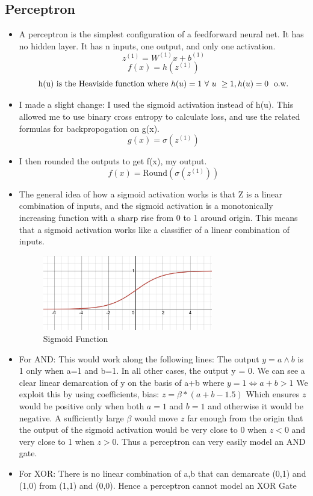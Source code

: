 \documentclass[12pt,a4paper]{article}
\begin{document}
\subsection{Perceptron} 
\begin{itemize}
\item A perceptron is the simplest configuration of a feedforward neural net. It has no hidden layer. It has n inputs, one output, and only one activation. \\
\[ z^{(1)} = W^{(1)}x + b^{(1)} \]
\[ f(x) = h( z^{(1)}) \]
\[\text{h(u) is the Heaviside function where} \\  \  h(u) = 1 \ \forall \ u \ \ge 1, h(u) = 0 \ \ \text{o.w.} \]
\item I made a slight change: I used the sigmoid activation instead of h(u). This allowed me to use binary cross entropy to calculate loss, and use the related formulas for backpropogation on g(x). 
\[ g(x) = \sigma( z^{(1)}) \]
\item I then rounded the outputs to get f(x), my output.
\[ f(x) = \text{Round}(\sigma( z^{(1)})) \]
\item The general idea of how a sigmoid activation works is that Z is a linear combination of inputs, and the sigmoid activation is a monotonically increasing function with a sharp rise from 0 to 1 around origin. This means that a sigmoid activation works like a classifier of a linear combination of inputs.
\begin{figure}[h!]
    \centering
    \includegraphics[width=0.7\textwidth]{sigmoid} 
    \caption{Sigmoid Function}
    \label{fig:example}
\end{figure}
\item For AND: This would work along the following lines:
\subitem The output  $y = a\land b$ is 1 only when a=1 and b=1. In all other cases, the output y = 0. We can see a clear linear demarcation of y on the basis of a+b where $y =1 \iff a+b > 1 $  
\subitem We exploit this by using coefficients, bias: $ z = \beta *(a+b -1.5) $  
\subitem Which ensures  $z$ would be positive only when both $a=1$ and $b=1$ and otherwise it would be negative. 
\subitem A sufficiently large $\beta$ would move $z$ far enough from the origin that the output of the sigmoid activation would be very close to 0 when $z<0$ and very close to 1 when $z>0$. Thus a perceptron can very easily model an AND gate.
\item For XOR: There is no linear combination of a,b that can demarcate (0,1) and (1,0) from (1,1) and (0,0). Hence a perceptron cannot model an XOR Gate



\end{itemize}
\end{document}
